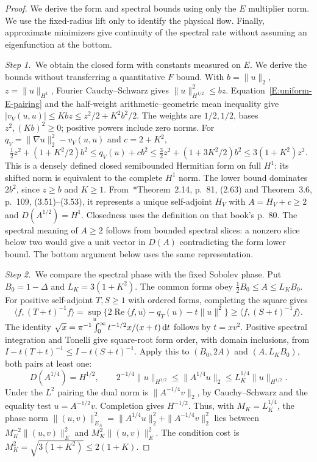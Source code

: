 \begin{proof}
  We derive the form and spectral bounds using only the $E$ multiplier norm.
  We use the fixed-radius lift only to identify the physical flow. Finally,
  approximate minimizers give continuity of the spectral rate without assuming
  an eigenfunction at the bottom.


  \medskip
  \noindent\textit{Step 1.~}We obtain the closed form with constants measured
  on $E$.
  We derive the bounds without transferring a quantitative $F$ bound. With $b =
  \|u\|_2$, $z = \|u\|_{H^1}$, Fourier Cauchy--Schwarz gives $\|u\|_{H^{1/2}}^2
  \le bz$. Equation~\eqref{E:uniform-E-pairing} and the half-weight
  arithmetic--geometric mean inequality give $|v_V(u,u)| \le Kbz \le
  z^2/2+K^2b^2/2$. The weights are $1/2,1/2$, bases $z^2,(Kb)^2 \ge 0$; positive
  powers include zero norms. For $q_V = \|\nabla u\|_2^2-v_V(u,u)$ and $c =
  2+K^2$,
  \begin{equation}\label{E:uniform-E-form-budget}
    \tfrac12z^2+(1+K^2/2)b^2
    \le q_V(u)+cb^2
    \le\tfrac32z^2+(1+3K^2/2)b^2
    \le3(1+K^2)z^2 .
  \end{equation}
  This is a densely defined closed semibounded Hermitian form on full $H^1$: its
  shifted norm is equivalent to the complete $H^1$ norm. The lower bound
  dominates $2b^2$, since $z \ge b$ and $K \ge 1$.
  From~\cite{teschl:14:mathematical}*{Theorem~2.14, p.~81, (2.63)} and
  Theorem~3.6, p.~109, (3.51)--(3.53), it represents a unique self-adjoint $H_V$
  with $A = H_V+c \ge 2$ and $D(A^{1/2}) = H^1$. Closedness uses the definition
  on that book's p.~80. The spectral meaning of $A \ge 2$ follows from bounded
  spectral slices: a nonzero slice below two would give a unit vector in $D(A)$
  contradicting the form lower bound. The bottom argument below uses the same
  representation.


  \medskip
  \noindent\textit{Step 2.~}We compare the spectral phase with the fixed
  Sobolev phase.
  Put $B_0 = 1-\Delta$ and $L_K = 3(1+K^2)$. The common forms obey $\tfrac12B_0
  \le A \le L_KB_0$. For positive self-adjoint $T,S \ge 1$ with ordered forms,
  completing the square gives
  \[
    \langle f,(T+t)^{-1}f\rangle
    =\sup_u\{2\operatorname{Re}\langle f,u\rangle-q_T(u)-t\|u\|^2\}
    \ge\langle f,(S+t)^{-1}f\rangle .
  \]
  The identity $\sqrt x = \pi^{-1}\int_0^\infty t^{-1/2}x/(x+t)\,\mathrm{d} t$ follows by
  $t = xv^2$. Positive spectral integration and Tonelli give square-root form
  order, with domain inclusions, from $I-t(T+t)^{-1} \le I-t(S+t)^{-1}$. Apply
  this to $(B_0,2A)$ and $(A,L_KB_0)$, both pairs at least one:
  \[
    D(A^{1/4})=H^{1/2},\qquad
    2^{-1/4}\|u\|_{H^{1/2}}\le\|A^{1/4}u\|_2
    \le L_K^{1/4}\|u\|_{H^{1/2}} .
  \]
  Under the $L^2$ pairing the dual norm is $\|A^{-1/4}v\|_2$, by Cauchy--Schwarz
  and the equality test $u = A^{-1/2}v$. Completion gives $H^{-1/2}$. Thus, with
  $M_K = L_K^{1/4}$, the phase norm $\|(u,v)\|_{E_A}^2 =
  \|A^{1/4}u\|_2^2+\|A^{-1/4}v\|_2^2$ lies between $M_K^{-2}\|(u,v)\|_E^2$ and
  $M_K^2\|(u,v)\|_E^2$. The condition cost is $M_K^2 = \sqrt{3(1+K^2)} \le
  2(1+K)$.



\end{proof}
